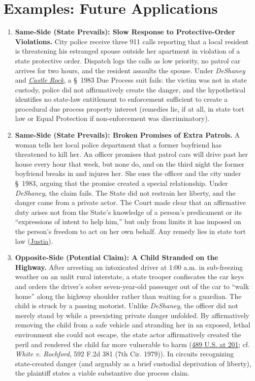 \documentclass[12pt]{article}
\begin{document}
\section{Examples: Future Applications}
\begin{enumerate}

\item \textbf{Same-Side (State Prevails): Slow Response to Protective-Order Violations.} City police receive three 911 calls reporting that a local resident is threatening his estranged spouse outside her apartment in violation of a state protective order. Dispatch logs the calls as low priority, no patrol car arrives for two hours, and the resident assaults the spouse. Under \textit{DeShaney} and \href{https://supreme.justia.com/cases/federal/us/545/748/}{\textit{Castle Rock}}, a \S~1983 Due Process suit fails: the victim was not in state custody, police did not affirmatively create the danger, and the hypothetical identifies no state-law entitlement to enforcement sufficient to create a procedural due process property interest (remedies lie, if at all, in state tort law or Equal Protection if non-enforcement was discriminatory).

\item \textbf{Same-Side (State Prevails): Broken Promises of Extra Patrols.} A woman tells her local police department that a former boyfriend has threatened to kill her. An officer promises that patrol cars will drive past her house every hour that week, but none do, and on the third night the former boyfriend breaks in and injures her. She sues the officer and the city under \S~1983, arguing that the promise created a special relationship. Under \textit{DeShaney}, the claim fails. The State did not restrain her liberty, and the danger came from a private actor. The Court made clear that an affirmative duty arises not from the State's knowledge of a person's predicament or its ``expressions of intent to help him,'' but only from limits it has imposed on the person's freedom to act on her own behalf. Any remedy lies in state tort law (\href{https://supreme.justia.com/cases/federal/us/489/189/}{Justia}).

\item \textbf{Opposite-Side (Potential Claim): A Child Stranded on the Highway.} After arresting an intoxicated driver at 1:00 a.m. in sub-freezing weather on an unlit rural interstate, a state trooper confiscates the car keys and orders the driver's sober seven-year-old passenger out of the car to ``walk home'' along the highway shoulder rather than waiting for a guardian. The child is struck by a passing motorist. Unlike \textit{DeShaney}, the officer did not merely stand by while a preexisting private danger unfolded. By affirmatively removing the child from a safe vehicle and stranding her in an exposed, lethal environment she could not escape, the state actor affirmatively created the peril and rendered the child far more vulnerable to harm (\href{https://supreme.justia.com/cases/federal/us/489/189/}{489 U.S. at 201}; cf. \textit{White v. Rochford}, 592 F.2d 381 (7th Cir. 1979)). In circuits recognizing state-created danger (and arguably as a brief custodial deprivation of liberty), the plaintiff states a viable substantive due process claim.


\end{enumerate}
\end{document}
